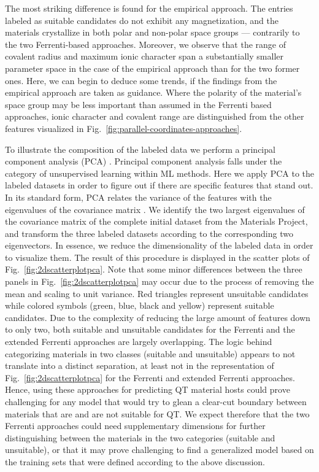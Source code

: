 \documentclass[superscriptaddress,unsortedaddress,
 amsmath,amssymb,
 aps,
]{revtex4-2}
\begin{document}
The most striking difference is found for the empirical approach. The entries labeled as suitable candidates do not exhibit any magnetization, and the materials crystallize in both polar and non-polar space groups --- contrarily to the two Ferrenti-based approaches. Moreover, we observe that the range of covalent radius and maximum ionic character span a substantially smaller parameter space in the case of the empirical approach than for the two former ones.  
Here, we can begin to deduce some trends, if the findings from the empirical approach are taken as guidance. Where the polarity of the material's space group may be less important than assumed in the Ferrenti based approaches, ionic character and covalent range are distinguished from the other features visualized in Fig.~\ref{fig:parallel-coordinates-approaches}. 


To illustrate the composition of the labeled data we perform a principal component analysis (PCA) \cite{Jolliffe2002}. Principal component analysis falls under the category of unsupervised learning within ML methods. Here we apply PCA to the labeled datasets in order to figure out if there are specific features that stand out. In its standard  form, PCA relates the variance of the features with the eigenvalues of the covariance matrix \cite{Jolliffe2002,Murphy2012,Hastie2009}. We identify the two largest eigenvalues of the covariance matrix \cite{Hastie2009} of the complete initial dataset from the Materials Project, and transform the three labeled datasets according to the corresponding two eigenvectors. In essence, we reduce the dimensionality of the labeled data in order to visualize them.
The result of this procedure is displayed in the scatter plots of Fig.~\ref{fig:2dscatterplotpca}. Note that some minor differences between the three panels in Fig.~\ref{fig:2dscatterplotpca} may occur due to the process of 
removing the mean and scaling to unit variance.
Red triangles represent unsuitable candidates while colored symbols (green, blue, black and yellow) represent suitable candidates. 
Due to the complexity of reducing the large amount of features down to only two, both suitable and unsuitable candidates for the Ferrenti and the extended Ferrenti approaches are largely overlapping. 
The logic behind categorizing materials in two classes (suitable and unsuitable) appears to not translate into a distinct separation, at least not in the representation of  Fig.~\ref{fig:2dscatterplotpca} for the Ferrenti and extended Ferrenti approaches.  
Hence, using these approaches for predicting QT material hosts could prove challenging for any model that would try to glean a clear-cut boundary between materials that are and are not suitable for QT. 
We expect therefore that the two Ferrenti approaches could need supplementary dimensions for further distinguishing between the materials in the two categories (suitable and unsuitable), or that it may prove challenging to find a generalized model based on the training sets that were defined according to the above discussion. 
\end{document}
